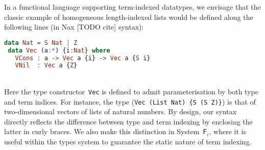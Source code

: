 \documentclass{llncs}
\newcommand{\Fi}{\ensuremath{\mathsf{F}_i}}
\begin{document}
In a functional language supporting term-indexed datatypes, we envisage
that the classic example of homogeneous length-indexed lists would be
defined along the following lines (in Nax [TODO cite] syntax):\vspace{-5pt}
\begin{lstlisting}[basicstyle={\ttfamily},language=Haskell]
 data Nat = S Nat | Z 
 data Vec (a:*) {i:Nat} where
   VCons : a -> Vec a {i} -> Vec a {S i}
   VNil  : Vec a {Z}
\end{lstlisting}~\vspace{-15pt}\\ \noindent
Here the type constructor~{\tt Vec} is defined to admit parameterisation
by both type and term indices.  For instance, the type 
(\verb|Vec (List Nat) {S (S Z)}|) is that of two-dimensional
vectors of lists of natural numbers.  By design, our syntax directly
reflects the difference between type and term indexing by enclosing the latter in
curly braces.  We also make this distinction in 
System~\Fi, where it is useful within the types system
to guarantee the static nature of term indexing.
\end{document}
